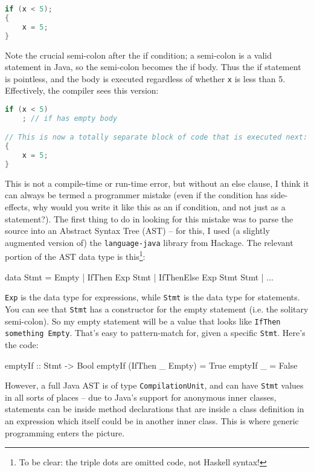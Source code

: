 \documentclass{tmr}
\begin{document}
\begin{lstlisting}[language=java]
if (x < 5);
{
    x = 5;
}
\end{lstlisting}

Note the crucial semi-colon after the if condition; a semi-colon is a valid statement in Java, so the semi-colon becomes the if body.  Thus the if statement is pointless, and the body is executed regardless of whether \lstinline|x| is less than 5.  Effectively, the compiler sees this version:

\begin{lstlisting}[language=java]
if (x < 5)
    ; // if has empty body

// This is now a totally separate block of code that is executed next:
{
    x = 5;
}
\end{lstlisting}

This is not a compile-time or run-time error, but without an else clause, I think it can always be termed a programmer mistake (even if the condition has side-effects, why would you write it like this as an if condition, and not just as a statement?).  The first thing to do in looking for this mistake was to parse the source into an Abstract Syntax Tree (AST) -- for this, I used (a slightly augmented version of) the \texttt{language-java} library from Hackage.  The relevant portion of the AST data type is this\footnote{To be clear: the triple dots are omitted code, not Haskell syntax!}:

\begin{code}
data Stmt = Empty | IfThen Exp Stmt | IfThenElse Exp Stmt Stmt | ...
\end{code}

\lstinline|Exp| is the data type for expressions, while \lstinline|Stmt| is the data type for statements.  You can see that \lstinline|Stmt| has a constructor for the empty statement (i.e. the solitary semi-colon).  So my empty statement will be a value that looks like \lstinline|IfThen something Empty|.  That's easy to pattern-match for, given a specific \lstinline|Stmt|.  Here's the code:

\begin{code}
emptyIf :: Stmt -> Bool
emptyIf (IfThen _ Empty) = True
emptyIf _ = False
\end{code}

However, a full Java AST is of type \lstinline|CompilationUnit|, and can have \lstinline|Stmt| values in all sorts of places -- due to Java's support for anonymous inner classes, statements can be inside method declarations that are inside a class definition in an expression which itself could be in another inner class.  This is where generic programming enters the picture.
\end{document}
